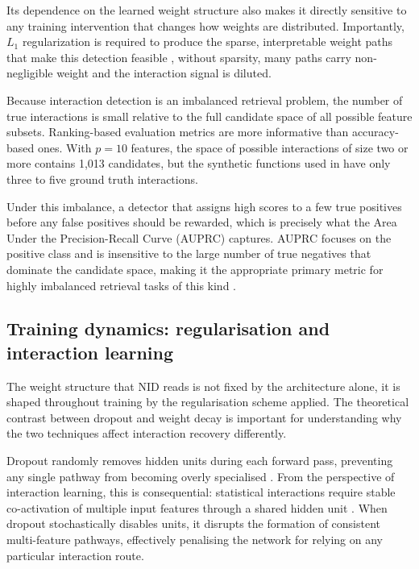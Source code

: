 \documentclass{article}
\begin{document}
Its dependence on the learned weight structure also makes it directly sensitive to any training intervention that changes how weights are distributed. Importantly, \(L_1\) regularization is required to produce the sparse, interpretable weight paths that make this detection feasible \citep{tsang2020featureinteractioninterpretabilitycase}, without sparsity, many paths carry non-negligible weight and the interaction signal is diluted.

Because interaction detection is an imbalanced retrieval problem, the number of true interactions is small relative to the full candidate space of all possible feature subsets. Ranking-based evaluation metrics are more informative than accuracy-based ones. With \(p = 10\) features, the space of possible interactions of size two or more contains 1,013 candidates, but the synthetic functions used in \cite{tsang2017detecting} have only three to five ground truth interactions.

Under this imbalance, a detector that assigns high scores to a few true positives before any false positives should be rewarded, which is precisely what the Area Under the Precision-Recall Curve (AUPRC) captures. AUPRC focuses on the positive class and is insensitive to the large number of true negatives that dominate the candidate space, making it the appropriate primary metric for highly imbalanced retrieval tasks of this kind \citep{davis2006relationship}.

\subsection{Training dynamics: regularisation and interaction learning}

The weight structure that NID reads is not fixed by the architecture alone, it is shaped throughout training by the regularisation scheme applied. The theoretical contrast between dropout and weight decay is important for understanding why the two techniques affect interaction recovery differently.

Dropout randomly removes hidden units during each forward pass, preventing any single pathway from becoming overly specialised \citep{lengerich2021dropoutregularizerinteractioneffects}. From the perspective of interaction learning, this is consequential: statistical interactions require stable co-activation of multiple input features through a shared hidden unit \citep{tsang2017detecting}. When dropout stochastically disables units, it disrupts the formation of consistent multi-feature pathways, effectively penalising the network for relying on any particular interaction route.
\end{document}
